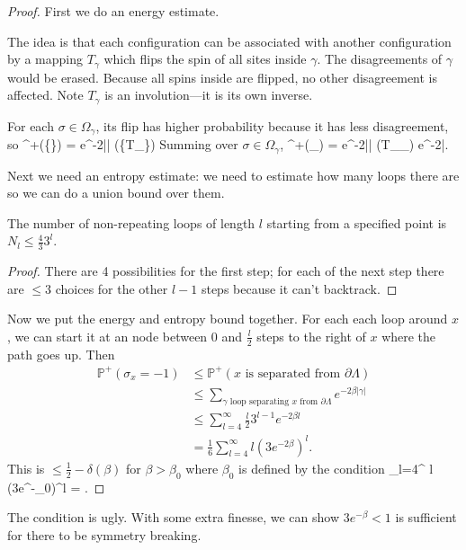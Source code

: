 \begin{proof}
First we do an energy estimate.

The idea is that each configuration can be associated with another configuration by a mapping $T_\gamma$ which flips the spin of all sites inside $\gamma$. The disagreements of $\gamma$ would be erased. Because all spins inside are flipped, no other disagreement is affected. Note $T_\gamma$ is an involution---it is its own inverse.

For each $\sigma\in \Omega_{\gamma}$, its flip has higher probability because it has less disagreement, so
\be
{}^+(\{\sigma\}) = e^{-2\beta |\gamma|} (\{T_\gamma\sigma\})%
\ee
Summing over $\sigma\in \Omega_{\gamma}$,
\be
{}^+(\Omega_{\gamma}) = e^{-2\beta |\gamma|} (T_\gamma\Omega_{\gamma}) \le e^{-2\beta |\gamma}.
\ee

Next we need an entropy estimate: we need to estimate how many loops there are so we can do a union bound over them.
\begin{lemma}
The number of non-repeating loops of length $l$ starting from a specified point is $N_l\le \frac{4}{3}3^l$.
\end{lemma}
\begin{proof}
There are 4 possibilities for the first step; for each of the next step there are $\le3$ choices for the other $l-1$ steps because it can't backtrack.
\end{proof}

Now we put the energy and entropy bound together.
For each each loop around $x$, we can start it at an node between 0 and $\frac{l}{2}$ steps to the right of $x$ where the path goes up. Then %
\begin{align*}
\mathbb{P}^+(\sigma_x=-1) &\le \mathbb{P}^+\left( \text{$x$ is separated from $\partial \Lambda$} \right)\\ 
&\le \sum_{\gamma\text{ loop separating $x$ from $\partial \Lambda$}} e^{-2\beta |\gamma|}\\
&\le \sum_{l=4}^{\infty} \frac{l}{2} 3^{l-1} e^{-2\beta l}\\
&=\frac{1}{6} \sum_{l=4}^{\infty} l(3e^{-2\beta})^l.
\end{align*}
This is $\le \frac{1}{2} - \delta(\beta)$ for $\beta>\beta_0$ where  $\beta_0$ is defined by the condition
\be
{} \sum_{l=4}^{\infty} l (3e^{-\beta_0})^l = .
\ee
\end{proof}
The condition is ugly. With some extra finesse, we can show $3e^{-\beta}<1$ is sufficient for there to be symmetry breaking.

